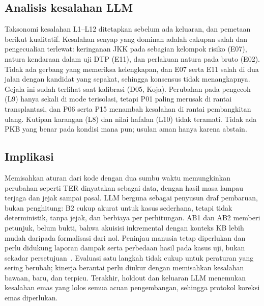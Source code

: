 \documentclass[journal,a4paper]{IEEEtran}
\makeatletter
\DeclareRobustCommand{\en}[1]{{\usefont{\f@encoding}{\f@family}{\f@series}{it}#1\/}}
\makeatother
\begin{document}
\subsection{Analisis kesalahan LLM}
Taksonomi kesalahan L1--L12 ditetapkan sebelum ada keluaran, dan pemetaan berikut kualitatif. Kesalahan senyap yang dominan adalah cakupan salah dan pengecualian terlewat: keringanan JKK pada sebagian kelompok risiko (E07), natura kendaraan dalam uji DTP (E11), dan perlakuan natura pada bruto (E02). Tidak ada gerbang yang memeriksa kelengkapan, dan E07 serta E11 salah di dua jalan dengan kandidat yang sepakat, sehingga konsensus tidak menangkapnya. Gejala ini sudah terlihat saat kalibrasi (D05, Koja). Perubahan pada pengecoh (L9) hanya sekali di mode terisolasi, tetapi P01 paling merusak di rantai transplantasi, dan P06 serta P15 menambah kesalahan di rantai pembangkitan ulang. Kutipan karangan (L8) dan nilai hafalan (L10) tidak teramati. Tidak ada PKB yang benar pada kondisi mana pun; usulan aman hanya karena \en{abstain}.

\subsection{Implikasi}
Memisahkan aturan dari kode dengan dua sumbu waktu memungkinkan perubahan seperti TER dinyatakan sebagai data, dengan hasil masa lampau terjaga dan jejak sampai pasal. LLM berguna sebagai penyusun draf pembaruan, bukan penghitung: B2 cukup akurat untuk kasus sederhana, tetapi tidak deterministik, tanpa jejak, dan berbiaya per perhitungan. AB1 dan AB2 memberi petunjuk, belum bukti, bahwa akuisisi inkremental dengan konteks KB lebih mudah daripada formalisasi dari nol. Peninjau manusia tetap diperlukan dan perlu didukung laporan dampak serta perbedaan hasil pada kasus uji, bukan sekadar persetujuan~\cite{enqvist2023oversight,green2022oversight}. Evaluasi satu langkah tidak cukup untuk peraturan yang sering berubah; kinerja berantai perlu diukur dengan memisahkan kesalahan bawaan, baru, dan terpicu. Terakhir, \en{holdout} dan keluaran LLM menemukan kesalahan emas yang lolos semua acuan pengembangan, sehingga protokol koreksi emas diperlukan.
\end{document}
